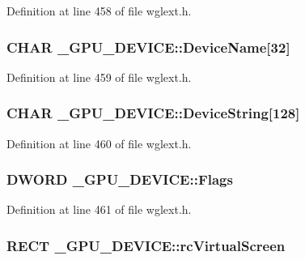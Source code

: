 Definition at line 458 of file wglext.\+h.

\hypertarget{struct___g_p_u___d_e_v_i_c_e_a604bfab61f1a2c5d1e635837d369ba14}{
\subsubsection[{Device\+Name}]{\setlength{\rightskip}{0pt plus 5cm}C\+H\+A\+R \+\_\+\+G\+P\+U\+\_\+\+D\+E\+V\+I\+C\+E\+::\+Device\+Name\mbox{[}32\mbox{]}}}\label{struct___g_p_u___d_e_v_i_c_e_a604bfab61f1a2c5d1e635837d369ba14}


Definition at line 459 of file wglext.\+h.

\hypertarget{struct___g_p_u___d_e_v_i_c_e_aff8b7920ccc85afcd6f325da6cdb0b73}{
\subsubsection[{Device\+String}]{\setlength{\rightskip}{0pt plus 5cm}C\+H\+A\+R \+\_\+\+G\+P\+U\+\_\+\+D\+E\+V\+I\+C\+E\+::\+Device\+String\mbox{[}128\mbox{]}}}\label{struct___g_p_u___d_e_v_i_c_e_aff8b7920ccc85afcd6f325da6cdb0b73}


Definition at line 460 of file wglext.\+h.

\hypertarget{struct___g_p_u___d_e_v_i_c_e_a008db9d0f5fc13a5160805f40465f14a}{
\subsubsection[{Flags}]{\setlength{\rightskip}{0pt plus 5cm}D\+W\+O\+R\+D \+\_\+\+G\+P\+U\+\_\+\+D\+E\+V\+I\+C\+E\+::\+Flags}}\label{struct___g_p_u___d_e_v_i_c_e_a008db9d0f5fc13a5160805f40465f14a}


Definition at line 461 of file wglext.\+h.

\hypertarget{struct___g_p_u___d_e_v_i_c_e_aeb573bbeb3b6c589246720ef259b9a27}{
\subsubsection[{rc\+Virtual\+Screen}]{\setlength{\rightskip}{0pt plus 5cm}R\+E\+C\+T \+\_\+\+G\+P\+U\+\_\+\+D\+E\+V\+I\+C\+E\+::rc\+Virtual\+Screen}}\label{struct___g_p_u___d_e_v_i_c_e_aeb573bbeb3b6c589246720ef259b9a27}


